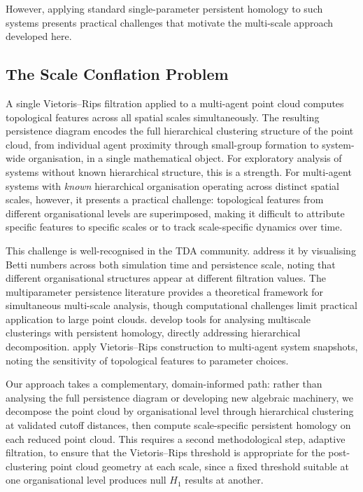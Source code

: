 However, applying standard single-parameter persistent homology to such systems presents practical challenges that motivate the multi-scale approach developed here.

\subsection{The Scale Conflation Problem}

A single Vietoris--Rips filtration applied to a multi-agent point cloud computes topological features across all spatial scales simultaneously. The resulting persistence diagram encodes the full hierarchical clustering structure of the point cloud, from individual agent proximity through small-group formation to system-wide organisation, in a single mathematical object. For exploratory analysis of systems without known hierarchical structure, this is a strength. For multi-agent systems with \emph{known} hierarchical organisation operating across distinct spatial scales, however, it presents a practical challenge: topological features from different organisational levels are superimposed, making it difficult to attribute specific features to specific scales or to track scale-specific dynamics over time.

This challenge is well-recognised in the TDA community. \citet{Topaz2015} address it by visualising Betti numbers across both simulation time and persistence scale, noting that different organisational structures appear at different filtration values. The multiparameter persistence literature \citep{BotnanLesnick2022,Lesnick2015} provides a theoretical framework for simultaneous multi-scale analysis, though computational challenges limit practical application to large point clouds. \citet{SchindlerBarahona2023} develop tools for analysing multiscale clusterings with persistent homology, directly addressing hierarchical decomposition. \citet{Gu2022} apply Vietoris--Rips construction to multi-agent system snapshots, noting the sensitivity of topological features to parameter choices.

Our approach takes a complementary, domain-informed path: rather than analysing the full persistence diagram or developing new algebraic machinery, we decompose the point cloud by organisational level through hierarchical clustering at validated cutoff distances, then compute scale-specific persistent homology on each reduced point cloud. This requires a second methodological step, adaptive filtration, to ensure that the Vietoris--Rips threshold is appropriate for the post-clustering point cloud geometry at each scale, since a fixed threshold suitable at one organisational level produces null \(H_1\) results at another.

